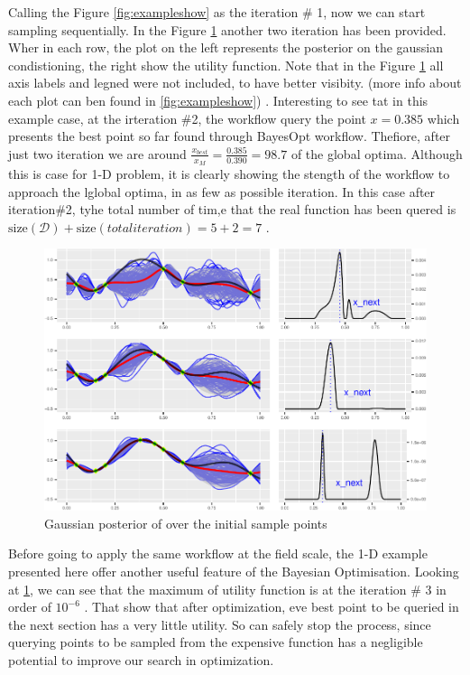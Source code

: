\documentclass[]{elsarticle} %
\begin{document}
Calling the Figure \ref{fig:exampleshow} as the iteration \# 1, now we can start sampling sequentially. In the Figure \ref{fig:allinone} another two iteration has been provided. Wher in each row, the plot on the left represents the posterior on the gaussian condistioning, the right show the utility function. Note that in the Figure \ref{fig:allinone} all axis labels and legned were not included, to have better visibity. (more info about each plot can ben found in \ref{fig:exampleshow}) . Interesting to see tat in this example case, at the irteration \#2, the workflow query the point \(x=0.385\) which presents the best point so far found through BayesOpt workflow. Thefiore, after just two iteration we are around \(\frac{x_{best}}{x_{M}}=\frac{0.385}{0.390}=98.7%
\) of the global optima. Although this is case for 1-D problem, it is clearly showing the stength of the workflow to approach the lglobal optima, in as few as possible iteration. In this case after iteration\#2, tyhe total number of tim,e that the real function has been quered is \(\text{size}(\mathcal{D}) + \text{size}(total iteration) = 5 + 2=7\) .

\begin{figure}

\includegraphics[width=0.9\linewidth,height=0.9\textheight]{0_Paper1_main_files/figure-latex/allinone-1} \hfill{}

\caption{Gaussian posterior of over the initial sample points}\label{fig:allinone}
\end{figure}

Before going to apply the same workflow at the field scale, the 1-D example presented here offer another useful feature of the Bayesian Optimisation. Looking at \ref{fig:allinone}, we can see that the maximum of utility function is at the iteration \# 3 in order of \(10^{-6}\) . That show that after optimization, eve best point to be queried in the next section has a very little utility. So can safely stop the process, since querying points to be sampled from the expensive function has a negligible potential to improve our search in optimization.
\end{document}
